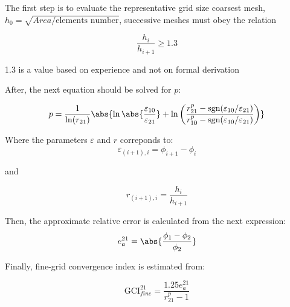 The first step is to evaluate the representative grid size coarsest mesh, $h_0=\sqrt{Area/\text{elements number}}$, successive meshes must obey the relation

\begin{equation}
\frac{h_i}{h_{i+1}}\ge 1.3
\end{equation}

1.3 is a value based on experience and not on formal derivation 

After, the next equation should be solved for $p$:

\begin{equation}
p=\frac{1}{\ln(r_{21})} \abs{\ln \abs{ \frac{\varepsilon_{10}}{\varepsilon_{21}}}+ \ln \left(\frac{r_{21}^p -\text{sgn}(\varepsilon_{10}/\varepsilon_{21})}{r_{10}^p -\text{sgn}(\varepsilon_{10}/\varepsilon_{21})}\right)}
\end{equation}

Where the parameters $\varepsilon$ and $r$ correponds to:
\begin{equation}
 \varepsilon_{(i+1),i}=\phi_{i+1}-\phi_i   
\end{equation}

and 

\begin{equation}
  r_{(i+1),i}=\frac{h_i}{h_{i+1}}
\end{equation}




Then, the approximate relative error is calculated from the next expression:
\begin{equation}
e_a^{21}=\abs{\frac{\phi_1-\phi_2}{\phi_2}}
\end{equation}


Finally, fine-grid convergence index is estimated from:

\begin{equation}
\text{GCI}_{fine}^{21}=\frac{1.25e_a^{21}}{r_{21}^p-1}
\end{equation}


